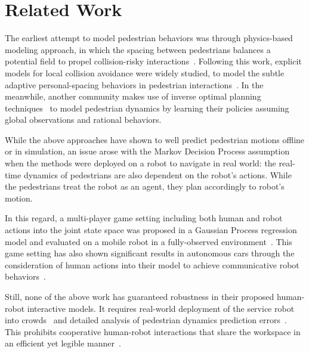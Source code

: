 \documentclass[conference]{IEEEtran}
\begin{document}
\section{Related Work}
\label{sec:related}
\vspace{-0.4em}
The earliest attempt to model pedestrian behaviors was through physics-based 
modeling approach, in which the spacing between pedestrians balances a 
potential field to propel collision-risky 
interactions~\cite{helbing1995social}. Following this work, explicit models 
for local collision avoidance were widely studied, to model the subtle 
adaptive personal-spacing behaviors in pedestrian 
interactions~\cite{papadakis2014adaptive}. In the meanwhile, another community 
makes use of inverse optimal planning 
techniques~\cite{ziebart2009planning,henry2010learning,vasquez2014inverse} to 
model pedestrian dynamics by learning their policies assuming global observations and 
rational behaviors.

While the above approaches have shown to well predict pedestrian motions 
offline or in simulation, an issue arose with the Markov Decision 
Process assumption when the methods were deployed on a robot to navigate in real world:
the real-time dynamics of pedestrians are also dependent on the robot's 
actions. While the pedestrians treat the robot as an agent, they plan 
accordingly to robot's motion. 

In this regard, a multi-player game setting including both human and robot actions into the joint state space was proposed in a Gaussian Process regression model and evaluated on a mobile robot in a fully-observed environment~\cite{trautman2010unfreezing}. This game setting has also shown significant results in autonomous cars through the consideration of human actions into their model to achieve communicative robot behaviors~\cite{sadigh2016planning}.

Still, none of the above work has guaranteed robustness in their proposed 
human-robot interactive models. It requires real-world 
deployment of the service robot into crowds~\cite{trautman2015robot} and 
detailed analysis of pedestrian dynamics prediction 
errors~\cite{pfeiffer2016predicting}. This prohibits cooperative human-robot 
interactions that share the workspace in an efficient yet legible manner~\cite{dragan2013legibility}.
\end{document}
